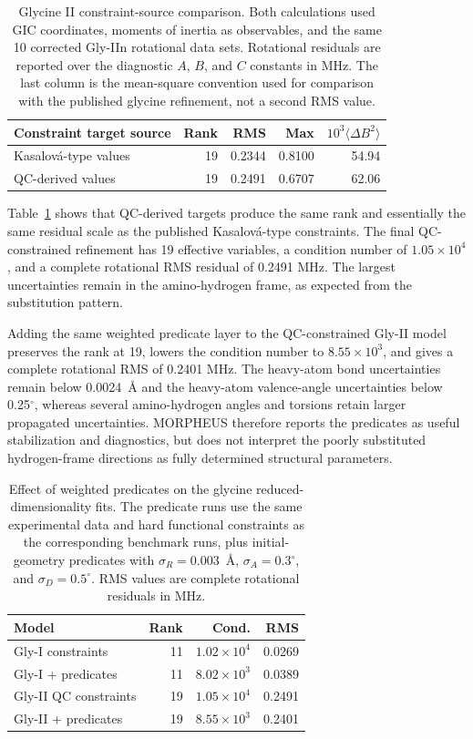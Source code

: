 \documentclass[aip,jcp,reprint,longbibliography,floatfix]{revtex4-2}
\begin{document}
\begin{table}[!htb]
\caption{Glycine II constraint-source comparison. Both calculations used GIC coordinates, moments of inertia as observables, and the same 10 corrected Gly-IIn rotational data sets. Rotational residuals are reported over the diagnostic $A$, $B$, and $C$ constants in MHz. The last column is the mean-square convention used for comparison with the published glycine refinement, not a second RMS value.}
\label{tab:glycine-constraint-comparison}
\begin{tabular}{lrrrr}
\toprule
Constraint target source & Rank & RMS & Max & $10^3\langle\Delta B^2\rangle$ \\
\midrule
Kasalov{\'a}-type values & 19 & 0.2344 & 0.8100 & 54.94 \\
QC-derived values & 19 & 0.2491 & 0.6707 & 62.06 \\
\bottomrule
\end{tabular}
\end{table}

Table~\ref{tab:glycine-constraint-comparison} shows that QC-derived targets
produce the same rank and essentially the same residual scale as the published
Kasalov{\'a}-type constraints. The final QC-constrained refinement has 19
effective variables, a condition number of $1.05\times10^4$, and a complete
rotational RMS residual of 0.2491 MHz. The largest uncertainties remain in the
amino-hydrogen frame, as expected from the substitution pattern.

Adding the same weighted predicate layer to the QC-constrained Gly-II model
preserves the rank at 19, lowers the condition number to $8.55\times10^3$, and
gives a complete rotational RMS of 0.2401 MHz. The heavy-atom bond
uncertainties remain below 0.0024~\AA{} and the heavy-atom valence-angle
uncertainties below 0.25$^\circ$, whereas several amino-hydrogen angles and
torsions retain larger propagated uncertainties. MORPHEUS therefore reports
the predicates as useful stabilization and diagnostics, but does not interpret
the poorly substituted hydrogen-frame directions as fully determined structural
parameters.

\begin{table}[!htb]
\caption{Effect of weighted predicates on the glycine reduced-dimensionality
fits. The predicate runs use the same experimental data and hard functional
constraints as the corresponding benchmark runs, plus initial-geometry
predicates with $\sigma_R=0.003$~\AA{}, $\sigma_A=0.3^\circ$, and
$\sigma_D=0.5^\circ$. RMS values are complete rotational residuals in MHz.}
\label{tab:glycine-predicate-checks}
\small
\setlength{\tabcolsep}{3pt}
\begin{tabular}{lrrr}
\toprule
Model & Rank & Cond. & RMS \\
\midrule
Gly-I constraints & 11 & $1.02\times10^4$ & 0.0269 \\
Gly-I + predicates & 11 & $8.02\times10^3$ & 0.0389 \\
Gly-II QC constraints & 19 & $1.05\times10^4$ & 0.2491 \\
Gly-II + predicates & 19 & $8.55\times10^3$ & 0.2401 \\
\bottomrule
\end{tabular}
\end{table}
\end{document}
